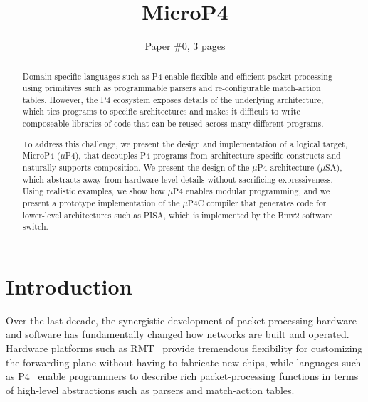 \documentclass{hotnets19}
\begin{document}


\title{MicroP4}

\author{Paper \#0, 3 pages}

\maketitle

\begin{abstract}
Domain-specific languages such as P4 enable flexible and efficient
packet-processing using primitives such as programmable parsers and
re-configurable match-action tables. However, the P4 ecosystem exposes
details of the underlying architecture, which ties programs to
specific architectures and makes it difficult to write composeable
libraries of code that can be reused across many different programs.

To address this challenge, we present the design and implementation of
a logical target, MicroP4 ($\mu$P4), that decouples P4 programs from
architecture-specific constructs and naturally supports composition.
We present the design of the $\mu$P4 architecture ($\mu$SA), which
abstracts away from hardware-level details without sacrificing
expressiveness. Using realistic examples, we show how $\mu$P4 enables
modular programming, and we present a prototype implementation of the
$\mu$P4C compiler that generates code for lower-level architectures
such as PISA, which is implemented by the Bmv2 software switch.
\end{abstract}

\section{Introduction}

Over the last decade, the synergistic development of packet-processing
hardware and software has fundamentally changed how networks are built
and operated. Hardware platforms such as
RMT~\cite{Bosshart:2013:FMF:2486001.2486011} provide tremendous
flexibility for customizing the forwarding plane without having to
fabricate new chips, while languages such as
P4~\cite{Bosshart:2014:PPP:2656877.2656890, p4lang} enable programmers
to describe rich packet-processing functions in terms of high-level
abstractions such as parsers and match-action tables.
\end{document}

